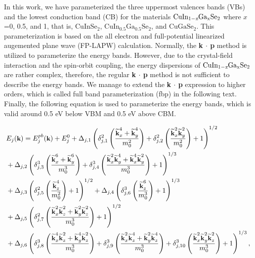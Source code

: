 \documentclass[a4paper, 12pt, titlepage,oneside,drop]{kthesis}
\begin{document}
In this work, we have parameterized the three uppermost valences bands (VBs) and the lowest conduction band (CB) for the materials $\mathrm { CuIn_{1-\textit{x}}Ga_{x}Se_2}$ where $x$=0, 0.5, and 1, that is,
$\mathrm{CuInSe_2}$, $\mathrm{CuIn_{0.5}Ga_{0.5}Se_2}$, and $\mathrm{CuGaSe_2}$. This parameterization is based on the all electron and full-potential linearized augemented plane wave (FP-LAPW) calculation.
Normally, the \textbf{k $\cdot$ p} method is utilized to parameterize the energy bands. However, due to the crystal-field interaction and the spin-orbit coupling, 
the energy dispersions of $\mathrm { CuIn_{1-\textit{x}}Ga_{x}Se_2}$ are rather complex, therefore, the regular \textbf{k $\cdot$ p} method is not sufficient to describe the energy bands. 
We manage to extend the \textbf{k $\cdot$ p} expression to higher orders, which is called full band parameterization (fbp) in the following text. Finally, the following equation is used to parameterize the energy bands,
 which is valid around 0.5 eV below VBM and 0.5 eV above CBM.

\begin{equation}\label{nonparabolic}
\begin{split}
& \small E_j(\textbf{k}) = E_{j}^{pb}(\textbf{k}) + E_j^0 + \Delta_{j,1} \left( \delta_{j,1}^2 \left( \frac{\widetilde{\textbf{k}}_{x}^{4}+\widetilde{ \textbf{k}}_{y}^{4}}{m_{0}^{2}} \right) + \delta_{j,2}^2 \left( \frac{\widetilde{\textbf{k}}_{x}^{2}\widetilde{\textbf{k}}_{y}^{2}}{m_{0}^2} \right) + 1 \right)^{1/2} \\
& \small + \Delta_{j,2} \left( \delta_{j,3}^3 \left( \frac{\widetilde{\textbf{k}}_{x}^{6}+\widetilde{ \textbf{k}}_{y}^{6}}{m_{0}^{3}} \right) + \delta_{j,4}^3 \left( \frac{\widetilde{\textbf{k}}_{x}^{2}\widetilde{\textbf{k}}_{y}^{4} + \widetilde{\textbf{k}}_{x}^{4}\widetilde{\textbf{k}}_{y}^{2}}{m_{0}^3} \right) + 1 \right)^{1/3} \\
& \small + \Delta_{j,3} \left( \delta_{j,5}^2 \left( \frac{\widetilde{\textbf{k}}_{z}^{4}}{m_0^2} \right) + 1 \right)^{1/2} + \Delta_{j,4} \left( \delta_{j,6}^3 \left( \frac{\widetilde{\textbf{k}}_{z}^{6}}{m_0^3} \right) + 1 \right)^{1/3} \\
& \small + \Delta_{j,5} \left( \delta_{j,7}^2 \left( \frac{\widetilde{\textbf{k}}_{x}^{2}\widetilde{\textbf{k}}_{z}^{2} + \widetilde{\textbf{k}}_{y}^{2}\widetilde{\textbf{k}}_{z}^{2}}{m_{0}^3} \right) + 1 \right)^{1/2} \\
& \small + \Delta_{j,6} \left( \delta_{j,8}^3 \left( \frac{\widetilde{\textbf{k}}_{x}^{4}\widetilde{\textbf{k}}_{z}^{2} + \widetilde{\textbf{k}}_{y}^{4}\widetilde{\textbf{k}}_{z}^{2}}{m_{0}^3} \right) + \delta_{j,9}^3 \left( \frac{\widetilde{\textbf{k}}_{x}^{2}\widetilde{\textbf{k}}_{z}^{4} + \widetilde{\textbf{k}}_{y}^{2}\widetilde{\textbf{k}}_{z}^{4}}{m_{0}^3} \right) + \delta_{j,10}^3 \left( \frac{\widetilde{\textbf{k}}_{x}^{2}\widetilde{\textbf{k}}_{y}^{2}\widetilde{\textbf{k}}_{z}^{2}}{m_{0}^3} \right) +1 \right)^{1/3},
\end{split}\end{equation}
\end{document}
